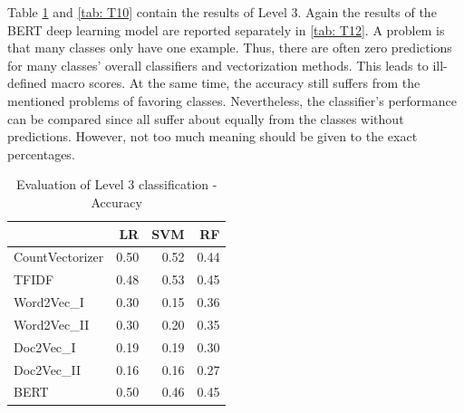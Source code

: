 \documentclass[12pt, a4paper, titlepage]{article}
\begin{document}
Table \ref{tab: T8} and \ref{tab: T10} contain the results of Level 3. Again the results of the \ac{BERT} deep learning model are reported separately in \ref{tab: T12}. A problem is that many classes only have one example. Thus, there are often zero predictions for many classes' overall classifiers and vectorization methods. This leads to ill-defined macro scores. At the same time, the accuracy still suffers from the mentioned problems of favoring classes. Nevertheless, the classifier's performance can be compared since all suffer about equally from the classes without predictions. However, not too much meaning should be given to the exact percentages.

\begin{table}[hb!]
  \center
\begin{tabular}{lrrr}
\hline
{} &   \textbf{LR} &   \textbf{SVM} &    \textbf{RF} \\
\hline
CountVectorizer &  0.50 &  0.52 &  0.44 \\
TFIDF           &  0.48 &  0.53 &  0.45 \\
Word2Vec\_I      &  0.30 &  0.15 &  0.36 \\
Word2Vec\_II     &  0.30 &  0.20 &  0.35 \\
Doc2Vec\_I       &  0.19 &  0.19 &  0.30 \\
Doc2Vec\_II      &  0.16 &  0.16 &  0.27 \\
BERT            &  0.50 &  0.46 &  0.45 \\
\hline
\end{tabular}
\caption{\label{tab: T8} Evaluation of Level 3 classification - Accuracy}
\end{table}


\begin{table}[hb!]
\caption{\label{tab: T10} Evaluation of Level 3 classification - macro}
\end{table}
\end{document}
